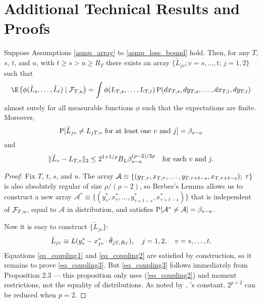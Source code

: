 \documentclass[11pt]{article} \def\baselinestretch{1.08}
\begin{document}
\section{Additional Technical Results and Proofs}
\newcommand{\insum}{P_T^{-1/2}\sum_{s = R_T + (i-1)b_T + 1}^{R_T + i b_T}}
\newcommand{\insump}{P_T^{-1/2}
  \sum_{s = R_T + \lfloor P_T / b_T \rfloor b_T + 1}^T}
\newcommand{\outsum}{\sum_{i=1}^{\lfloor P_T/b_T \rfloor}}
\newcommand{\outsump}{\sum_{i=2}^{\lfloor P_T/b_T \rfloor + 1}}

\renewcommand{\L}{\mathcal L}

\begin{lem} \label{lem_coupling}
 Suppose Assumptions \ref{asmp_array} to \ref{asmp_loss_bound} hold.
 Then, for any $T$, $s$, $t$, and $u$, with $t \geq s > u \geq R_T$
 there exists an array $\{\tilde L_{jv}; v = s, \dotsc, t;\, j =
 1,2\}$  such that
 \begin{equation} \label{eq_coupling1}
   \E\left(\phi(\tilde L_s, \dotsc, \tilde L_t) \mid \FT{u} \right) = 
   \int \phi(\fT{}{s}, \dotsc, \fT{}{t}) \p(d\xT{}{s}, d\yT{s}, \dotsc,
   d\xT{}{t}, d\yT{t})
 \end{equation}
 almost surely for all measurable functions $\phi$ such that the expectations
 are finite.  Moreover, 
\begin{equation} \label{eq_coupling2}
  \operatorname{P}[\tilde L_{jv} \neq L_{{j}T,{v}} \text{ for at least one $v$ and $j$}] =
 \beta_{s-u}
\end{equation}
 and
\begin{equation} \label{eq_coupling3}
  \| \tilde L_v - L_{{}T,{v}} \|_2 \leq 2^{1+1/\rho} B_L
  \beta_{s-u}^{(\rho-2)/2\rho} \quad \text{for each $v$ and $j$.}
\end{equation}
\end{lem}

\begin{proof}
  \newcommand{\A}{\mathcal A}
  Fix $T$, $t$, $s$, and $u$.  The array $\A \equiv
  \{(\yT{\tau},\xT{}{\tau}, \dotsc, \yT{\tau + t-s}, \xT{}{\tau +
  t-s}); \; \tau\}$ is also absolutely regular of size
  $\rho/(\rho-2)$, so Berbee's Lemma allows
  us to construct a new array $\A^* \equiv \{( y_\tau^*,x_\tau^*,
  \dotsc, y_{\tau + t-s}^*, 
  x_{\tau + t-s}^*)\}$ that is independent of $\mathcal F_{T,{u}}$, equal to
  $\A$ in distribution, and satisfies $\p[\A^* \neq \A] =
  \beta_{s-u}$.

  Now it is easy to construct $\{\tilde L_{jv}\}$:
  \begin{equation}
    \tilde L_{jv} \equiv L(y_v^* - x_{jv}^* \cdot \hat \theta_{{j}T,{R_T}}), \quad j
    = 1,2, \quad v = s, \dotsc, t.
  \end{equation}
  Equations \eqref{eq_coupling1} and \eqref{eq_coupling2} are
  satisfied by construction, so it remains to prove
  \eqref{eq_coupling3}.  But \eqref{eq_coupling3} follows immediately
  from  Proposition 2.3 ---
  this proposition only uses (\ref{eq_coupling2}) and moment
  restrictions, not the equality of distributions.  As noted by
  , 's
  constant, $2^{p+2}$ can be reduced when $p=2$.
\end{proof}
\end{document}
